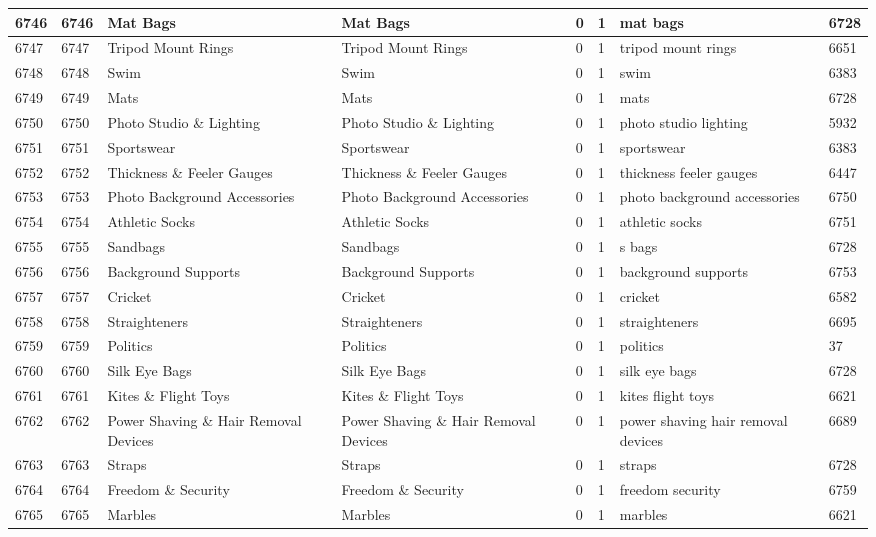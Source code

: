 \begin{longtable}{|l|l|l|l|l|l|l|l|}
6746 & 6746 & Mat Bags & Mat Bags & 0 & 1 & mat bags & 6728 \\ \hline 
6747 & 6747 & Tripod Mount Rings & Tripod Mount Rings & 0 & 1 & tripod mount rings & 6651 \\ \hline 
6748 & 6748 & Swim & Swim & 0 & 1 & swim & 6383 \\ \hline 
6749 & 6749 & Mats & Mats & 0 & 1 & mats & 6728 \\ \hline 
6750 & 6750 & Photo Studio \& Lighting & Photo Studio \& Lighting & 0 & 1 & photo studio lighting & 5932 \\ \hline 
6751 & 6751 & Sportswear & Sportswear & 0 & 1 & sportswear & 6383 \\ \hline 
6752 & 6752 & Thickness \& Feeler Gauges & Thickness \& Feeler Gauges & 0 & 1 & thickness feeler gauges & 6447 \\ \hline 
6753 & 6753 & Photo Background Accessories & Photo Background Accessories & 0 & 1 & photo background accessories & 6750 \\ \hline 
6754 & 6754 & Athletic Socks & Athletic Socks & 0 & 1 & athletic socks & 6751 \\ \hline 
6755 & 6755 & Sandbags & Sandbags & 0 & 1 & s bags & 6728 \\ \hline 
6756 & 6756 & Background Supports & Background Supports & 0 & 1 & background supports & 6753 \\ \hline 
6757 & 6757 & Cricket & Cricket & 0 & 1 & cricket & 6582 \\ \hline 
6758 & 6758 & Straighteners & Straighteners & 0 & 1 & straighteners & 6695 \\ \hline 
6759 & 6759 & Politics & Politics & 0 & 1 & politics & 37 \\ \hline 
6760 & 6760 & Silk Eye Bags & Silk Eye Bags & 0 & 1 & silk eye bags & 6728 \\ \hline 
6761 & 6761 & Kites \& Flight Toys & Kites \& Flight Toys & 0 & 1 & kites flight toys & 6621 \\ \hline 
6762 & 6762 & Power Shaving \& Hair Removal Devices & Power Shaving \& Hair Removal Devices & 0 & 1 & power shaving hair removal devices & 6689 \\ \hline 
6763 & 6763 & Straps & Straps & 0 & 1 & straps & 6728 \\ \hline 
6764 & 6764 & Freedom \& Security & Freedom \& Security & 0 & 1 & freedom security & 6759 \\ \hline 
6765 & 6765 & Marbles & Marbles & 0 & 1 & marbles & 6621 \\ \hline 

\end{longtable}
